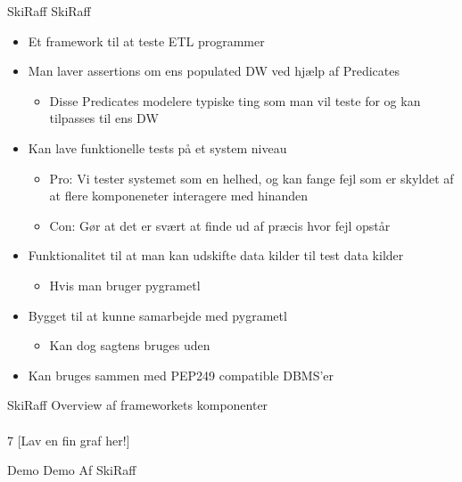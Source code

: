\begin{frame}{SkiRaff}{}
  SkiRaff
  \begin{itemize}
  \item<2-> Et framework til at teste ETL programmer
  \item<3-> Man laver assertions om ens populated DW ved hjælp af Predicates
    \begin{itemize}
      \item Disse Predicates modelere typiske ting som man vil teste for og kan tilpasses til ens DW
    \end{itemize}
  \item<4-> Kan lave funktionelle tests på et system niveau
    \begin{itemize}
    \item Pro: Vi tester systemet som en helhed, og kan fange fejl som er skyldet af at flere komponeneter interagere med hinanden
    \item Con: Gør at det er svært at finde ud af præcis hvor fejl opstår
    \end{itemize}
  \item<5-> Funktionalitet til at man kan udskifte data kilder til test data kilder
    \begin{itemize}
    \item Hvis man bruger pygrametl
    \end{itemize}
  \item<6-> Bygget til at kunne samarbejde med pygrametl
    \begin{itemize}
    \item Kan dog sagtens bruges uden
    \end{itemize}
  \item<7-> Kan bruges sammen med PEP249 compatible DBMS'er
  \end{itemize}
\end{frame}

\begin{frame}{SkiRaff}{}
  Overview af frameworkets komponenter \\ \\7
  [Lav en fin graf her!]
\end{frame}

\begin{frame}{Demo}{}
Demo Af SkiRaff
\end{frame}
